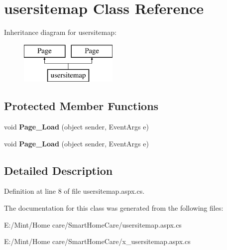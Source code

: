 \hypertarget{classusersitemap}{\section{usersitemap Class Reference}
\label{classusersitemap}
}
Inheritance diagram for usersitemap\-:\begin{figure}[H]
\begin{center}
\leavevmode
\includegraphics[height=2.000000cm]{classusersitemap}
\end{center}
\end{figure}
\subsection*{Protected Member Functions}
\begin{DoxyCompactItemize}
\item 
\hypertarget{classusersitemap_ad0202ea231079855724ccc96b1ad6d21}{void {\bfseries Page\-\_\-\-Load} (object sender, Event\-Args e)}\label{classusersitemap_ad0202ea231079855724ccc96b1ad6d21}

\item 
\hypertarget{classusersitemap_ad0202ea231079855724ccc96b1ad6d21}{void {\bfseries Page\-\_\-\-Load} (object sender, Event\-Args e)}\label{classusersitemap_ad0202ea231079855724ccc96b1ad6d21}

\end{DoxyCompactItemize}


\subsection{Detailed Description}


Definition at line 8 of file usersitemap.\-aspx.\-cs.



The documentation for this class was generated from the following files\-:\begin{DoxyCompactItemize}
\item 
E\-:/\-Mint/\-Home care/\-Smart\-Home\-Care/usersitemap.\-aspx.\-cs\item 
E\-:/\-Mint/\-Home care/\-Smart\-Home\-Care/x\-\_\-usersitemap.\-aspx.\-cs\end{DoxyCompactItemize}
